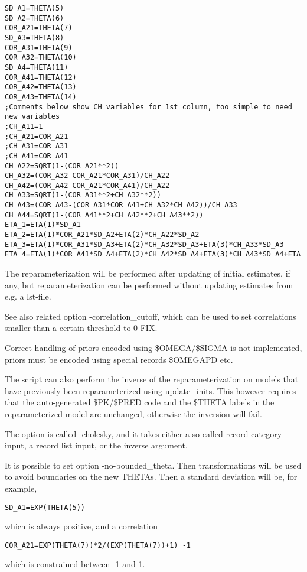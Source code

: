 \begin{verbatim}
SD_A1=THETA(5)
SD_A2=THETA(6)
COR_A21=THETA(7)
SD_A3=THETA(8)
COR_A31=THETA(9)
COR_A32=THETA(10)
SD_A4=THETA(11)
COR_A41=THETA(12)
COR_A42=THETA(13)
COR_A43=THETA(14)
;Comments below show CH variables for 1st column, too simple to need new variables
;CH_A11=1
;CH_A21=COR_A21
;CH_A31=COR_A31
;CH_A41=COR_A41
CH_A22=SQRT(1-(COR_A21**2))
CH_A32=(COR_A32-COR_A21*COR_A31)/CH_A22
CH_A42=(COR_A42-COR_A21*COR_A41)/CH_A22
CH_A33=SQRT(1-(COR_A31**2+CH_A32**2))
CH_A43=(COR_A43-(COR_A31*COR_A41+CH_A32*CH_A42))/CH_A33
CH_A44=SQRT(1-(COR_A41**2+CH_A42**2+CH_A43**2))
ETA_1=ETA(1)*SD_A1
ETA_2=ETA(1)*COR_A21*SD_A2+ETA(2)*CH_A22*SD_A2
ETA_3=ETA(1)*COR_A31*SD_A3+ETA(2)*CH_A32*SD_A3+ETA(3)*CH_A33*SD_A3
ETA_4=ETA(1)*COR_A41*SD_A4+ETA(2)*CH_A42*SD_A4+ETA(3)*CH_A43*SD_A4+ETA(4)*CH_A44*SD_A4
\end{verbatim}

The reparameterization will be performed after updating of initial estimates, if any, but
reparameterization can be performed without updating estimates from e.g. a lst-file.

See also related option -correlation\_cutoff, which can be used to set correlations smaller than
a certain threshold to 0 FIX.

Correct handling of priors encoded using \$OMEGA/\$SIGMA is not implemented, priors must 
be encoded using special records \$OMEGAPD etc.

The script can also perform the inverse of the reparameterization on models that have previously been 
reparameterized using update\_inits. This however requires that
the auto-generated \$PK/\$PRED code and the \$THETA labels in the reparameterized model are unchanged,
otherwise the inversion will fail.

The option is called -cholesky, and it takes either a so-called record category input, a record list input,
or the inverse argument.

It is possible to set option -no-bounded\_theta. Then transformations will be used to avoid boundaries on the new THETAs. Then
a standard deviation will be, for example,
\begin{verbatim}
SD_A1=EXP(THETA(5))
\end{verbatim}
which is always positive, and a correlation
\begin{verbatim}
COR_A21=EXP(THETA(7))*2/(EXP(THETA(7))+1) -1
\end{verbatim}
which is constrained between -1 and 1. %
